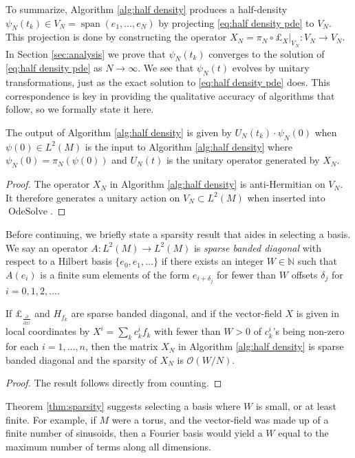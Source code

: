 \documentclass[final,leqno]{siamart}
\newcommand{\pder}[2]{\ensuremath{\frac{ \partial #1}{\partial #2}}}
\begin{document}
To summarize, Algorithm \ref{alg:half density} produces a half-density $\psi_{N}(t_{k}) \in V_{N} = \operatorname{span}(e_1,\dots,e_N)$ by projecting \eqref{eq:half density pde} to $V_N$.
This projection is done by constructing the operator $X_{N} = \pi_{N} \circ \pounds_{X} |_{V_{N}}: V_{N} \to V_{N}$.
In Section \ref{sec:analysis} we prove that $\psi_{N}(t_{k})$ converges to the solution of \eqref{eq:half density pde} as $N \to \infty$.
We see that $\psi_{N}(t)$ evolves by unitary transformations, just as the exact solution to \eqref{eq:half density pde} does.
This correspondence is key in providing the qualitative accuracy of algorithms that follow, so we formally state it here.
\begin{proposition} \label{prop:unitary}
	The output of Algorithm \ref{alg:half density} is given by $U_{N}(t_{k}) \cdot \psi_{N}(0)$ when $\psi(0) \in L^2(M)$ is the input to Algorithm \ref{alg:half density} where $\psi_{N}(0) = \pi_{N}( \psi(0) )$ and $U_{N}(t)$ is the unitary operator generated by $X_{N}$.
\end{proposition}
\begin{proof}
	The operator $X_{N}$ in Algorithm \ref{alg:half density} is anti-Hermitian on $V_{N}$.
	It therefore generates a unitary action on $V_{N} \subset L^{2}(M)$ when inserted into $\operatorname{OdeSolve}$.
\end{proof}

Before continuing, we briefly state a sparsity result that aides in selecting a basis.
We say an operator $A : L^{2}(M) \to L^{2}(M)$ is \emph{sparse banded diagonal} with respect to a Hilbert basis $\{ e_{0} , e_{1},\dots\}$ if there exists an integer $W \in \mathbb{N}$
such that $A(e_{i})$ is a finite sum elements of the form $e_{i + \delta_{j}}$ for fewer than $W$ offsets $\delta_{j}$ for $i = 0,1,2, \dots$.
\begin{theorem} \label{thm:sparsity}
	If $\pounds_{\pder{}{x^{j}}}$ and $H_{f_{k}}$ are sparse banded diagonal, 
	and if the vector-field $X$ is given in local coordinates by $X^{i} = \sum_{k} c_{k}^{i} f_{k}$ with fewer than $W>0$ of $c^{i}_{k}$'s being non-zero for each $i=1,\dots,n$, then the matrix $X_{N}$ in Algorithm \ref{alg:half density} is sparse banded diagonal and the sparsity of $X_{N}$ is $\mathcal{O}( W / N )$.
\end{theorem}
\begin{proof}
The result follows directly from counting.
\end{proof}

Theorem \ref{thm:sparsity} suggests selecting a basis where $W$ is small, or at least finite.
For example, if $M$ were a torus, and the vector-field was made up of a finite number of sinusoids, then a Fourier basis would yield a $W$ equal to the maximum number of terms along all dimensions.
\end{document}
